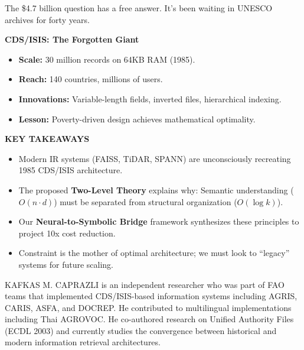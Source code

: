 \documentclass[manuscript,screen,nonacm]{acmart}
\newenvironment{customsidebar}{
  \begin{tcolorbox}[colback=gray!10,colframe=gray!50,arc=0mm,title=\textbf{Sidebar}]
}{
  \end{tcolorbox}
}
\begin{document}
The \$4.7 billion question has a free answer. It's been waiting in UNESCO archives for forty years.

\begin{customsidebar}
\textbf{CDS/ISIS: The Forgotten Giant}
\begin{itemize}
    \item \textbf{Scale:} 30 million records on 64KB RAM (1985).
    \item \textbf{Reach:} 140 countries, millions of users.
    \item \textbf{Innovations:} Variable-length fields, inverted files, hierarchical indexing.
    \item \textbf{Lesson:} Poverty-driven design achieves mathematical optimality.
\end{itemize}
\end{customsidebar}

\begin{customsidebar}
\textbf{KEY TAKEAWAYS}
\begin{itemize}
    \item Modern IR systems (FAISS, TiDAR, SPANN) are unconsciously recreating 1985 CDS/ISIS architecture.
    \item The proposed \textbf{Two-Level Theory} explains why: Semantic understanding ($O(n \cdot d)$) must be separated from structural organization ($O(\log k)$).
    \item Our \textbf{Neural-to-Symbolic Bridge} framework synthesizes these principles to project 10x cost reduction.
    \item Constraint is the mother of optimal architecture; we must look to ``legacy'' systems for future scaling.
\end{itemize}
\end{customsidebar}




\begin{acks}
KAFKAS M. CAPRAZLI is an independent researcher who was part of FAO teams that implemented CDS/ISIS-based information systems including AGRIS, CARIS, ASFA, and DOCREP. He contributed to multilingual implementations including Thai AGROVOC. He co-authored research on Unified Authority Files \cite{caprazli2003} (ECDL 2003) and currently studies the convergence between historical and modern information retrieval architectures.
\end{acks}
\end{document}
